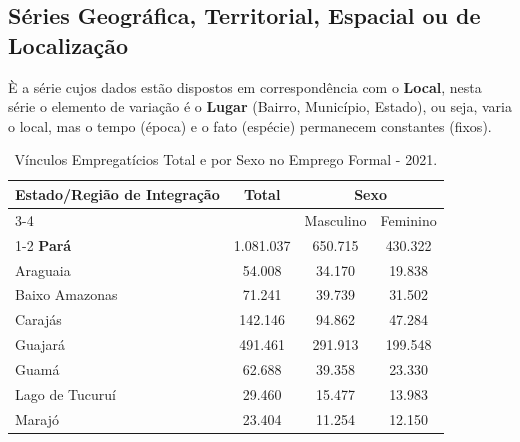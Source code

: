 \newpage
\subsection{Séries Geográfica, Territorial, Espacial ou de Localização}

È a série cujos dados estão dispostos em correspondência com o \textbf{Local}, nesta série o elemento de variação é o \textbf{Lugar} (Bairro, Município, Estado), ou seja, varia o local, mas o tempo (época) e o fato (espécie) permanecem constantes (fixos).


\begin{table}[!htb]
\centering
    {
    \caption{Vínculos Empregatícios Total e por Sexo no Emprego Formal - 2021.}
    \label{obitos2}
    \vspace{0.1cm}
\begin{tabular}{l|c|c|c}
\hline\hline
\multirow{2}{*}{Estado/Região de Integração} & \multicolumn{1}{c|}{\multirow{2}{*}{Total}} & \multicolumn{2}{c}{Sexo}                                     \\ \cline{3-4} 
                           & \multicolumn{1}{c|}{}                       & \multicolumn{1}{c|}{Masculino} & \multicolumn{1}{c}{Feminino} \\ \cline{1-2}
\hline\hline
\textbf{Pará}              &  1.081.037                                 &  650.715                      &   430.322                    \\
\hline
Araguaia                   &  54.008                                    &  34.170                       &   19.838                     \\
Baixo Amazonas             &  71.241                                    &  39.739                       &   31.502                     \\
Carajás                    &  142.146                                   &  94.862                       &   47.284                     \\
Guajará                    &  491.461                                   &  291.913                      &   199.548                     \\
Guamá                      &  62.688                                    &  39.358                       &   23.330                      \\
Lago de Tucuruí            &  29.460                                    &  15.477                       &   13.983                       \\
Marajó                     &  23.404                                    &  11.254                       &   12.150                           \\

\end{tabular}}
\end{table}
